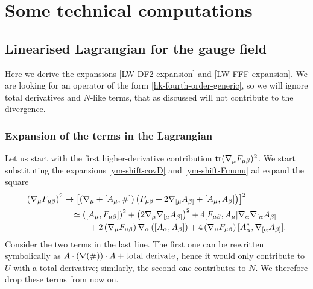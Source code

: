 


\chapter{Some technical computations}
\pagestyle{fancy}
	\fancyhead{} %
	\fancyhead[LE]{\scshape \leftmark}
	\fancyhead[RO]{\scshape \rightmark}
	\fancyfoot[CE,CO]{\thepage}
	\fancyfoot[LO,RO]{ }
	\fancyfoot[LE,RE]{ }
	\renewcommand{\headrulewidth}{0.4pt}
	\renewcommand{\footrulewidth}{0.4pt}


\section{Linearised Lagrangian  for the gauge field}

Here we derive the expansions \eqref{LW-DF2-expansion} and \eqref{LW-FFF-expansion}.
We are looking for an operator of the form \eqref{hk-fourth-order-generic}, so we will ignore total derivatives and $N$-like terms, that as discussed will not contribute to the divergence.



\subsection{Expansion of the terms in the Lagrangian}


Let us start with the first higher-derivative contribution
\(\operatorname{tr} ({ \mathcal{\nabla} }_\mu F_{\mu \beta} )^2  \).
We start substituting the expansions  \eqref{ym-shift-covD} and \eqref{ym-shift-Fmunu} ad expand the square
\begin{align*}
\left({ \mathcal{\nabla} }_\mu F_{\mu \beta} \right)^2  
& \rightarrow 
	\left[
		\left(
			{ \mathcal{\nabla} }_\mu + [A_\mu, \#]
		\right)
		\left(
			F_{\mu \beta} 
				+ 2 { \mathcal{\nabla} }_{ [ \mu } A_{ \beta ] }  
				+ [A_\mu, A_\beta  ]
		\right)
	\right]^2
	\\
& \quad \simeq
 	\left(
 		[A_\mu , F_{\mu\beta}]
 	\right)^2
 	+ 
 	\left(
 		2 { \mathcal{\nabla} }_\mu { \mathcal{\nabla} }_{ [ \mu } A_{ \beta ] }
 	\right)^2 
 	+ 4 [  F_{ \mu \beta} , A_\mu ] { \mathcal{\nabla} }_\alpha
 		 { \mathcal{\nabla} }_{ [ \alpha } A_{ \beta ] }
 	\\
& \qquad  \quad	
 	+ 2 
 	\left(
 		{ \mathcal{\nabla} }_\mu F_{\mu \beta} 
	\right)
 	{ \mathcal{\nabla} }_\alpha
 	\left(
 		[ A_\alpha , A_\beta ]
 	\right)
	+ 4
	\left( 
		{ \mathcal{\nabla} }_\mu F_{\mu \beta}
	\right) 
	[ A_\alpha^c  , 
		{ \mathcal{\nabla} }_{ [ \alpha } A_{ \beta ] } 
	].
\end{align*}
Consider the two terms in the last line. The first one can be rewritten symbolically as \( A \cdot ( { \mathcal{\nabla} }(\#) ) \cdot A + \text{total derivate} \), hence it would only contribute to \( U \) with a total derivative; similarly, the second one contributes to \( N \). We therefore drop these terms from now on. 



